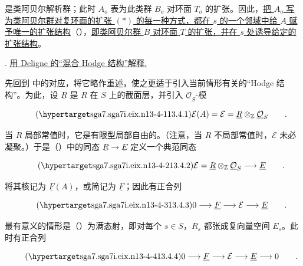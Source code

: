 \noindent
是类阿贝尔解析群；此时 $A_o$ 表为此类群 $B_o$ 对环面 $T_o$ 的扩张。因此，\underline{把 $A_o$ 写为类阿贝尔群对复环面的扩张 $(*)$ 的每一种方式，都在 $s$ 的一个邻域中给 $A$ 赋予唯一的扩张结构}（），\underline{即类阿贝尔群 $B$ 对环面 $T$ 的扩张，并在 $s$ 处诱导给定的扩张结构}。



\medskip
\noindent
{}. \underline{用 Deligne 的“混合 Hodge 结构”解释.}

先回到  中的对应，将它略作重述，使之更适于引入当前情形有关的“Hodge 结构”。为此，设 $\underline R$ 是 $R$ 在 $S$ 上的截面层，并引入 $\underline{\mathcal O}_S$-模

\begin{equation}\tag{\SGARefTarget{sga7.sga7i.eix.n13-4-1}{13.4.1}}
 \mathcal E(A)=\mathcal E=
 \underline R\otimes_{\mathbb Z}\underline{\mathcal O}_S\qquad .
\end{equation}

\noindent
当 $R$ 局部常值时，它是有限型局部自由的。（注意，当 $R$ 不局部常值时，$\mathcal E$ 未必凝聚。）于是（）中的同态 $\underline R\longrightarrow\underline E$ 定义一个典范同态

\begin{equation}\tag{\SGARefTarget{sga7.sga7i.eix.n13-4-2}{13.4.2}}
 \mathcal E=\underline R\otimes_{\mathbb Z}
 \underline{\mathcal O}_S\longrightarrow\underline E\qquad .
\end{equation}

\noindent
将其核记为 $\underline F(A)$，或简记为 $\underline F$；因此有正合列

\begin{equation}\tag{\SGARefTarget{sga7.sga7i.eix.n13-4-3}{13.4.3}}
 0\longrightarrow\underline F\longrightarrow\mathcal E
 \longrightarrow\underline E\qquad .
\end{equation}

\noindent
最有意义的情形是（）为满态射，即对每个 $s\in S$，$R_s$ 都张成复向量空间 $E_s$。此时有正合列

\begin{equation}\tag{\SGARefTarget{sga7.sga7i.eix.n13-4-4}{13.4.4}}
 0\longrightarrow\underline F\longrightarrow\mathcal E
 \longrightarrow\underline E\longrightarrow0\qquad .
\end{equation}

